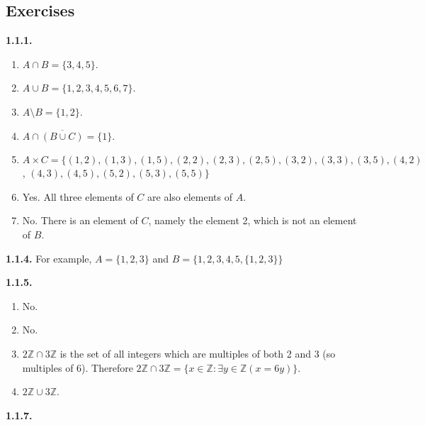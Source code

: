\documentclass[10pt,]{book}
\theoremstyle{plain}
\theoremstyle{definition}
\theoremstyle{definition}
\theoremstyle{definition}
\theoremstyle{definition}
\numberwithin{equation}{chapter}
\newcommand{\Z}{\mathbb Z}
\newcommand{\st}{:}
\renewcommand{\bar}{\overline}
\begin{document}
\subsection*{ Exercises}
\noindent\textbf{1.1.1.} \hypertarget{p-625}{}%
\leavevmode%
\begin{enumerate}[label=(\alph*)]
\item\hypertarget{li-288}{}\(A \cap B = \{3,4,5\}\).%
\item\hypertarget{li-289}{}\(A \cup B = \{1,2,3,4,5,6,7\}\).%
\item\hypertarget{li-290}{}\(A \setminus B = \{1,2\}\).%
\item\hypertarget{li-291}{}\(A \cap \bar{(B \cup C)} = \{1\}\).%
\item\hypertarget{li-292}{}\(A \times C = \{ (1,2), (1,3), (1,5), (2,2), (2,3), (2,5), (3,2), (3,3), (3,5), (4,2)\), \((4,3), (4,5), (5,2), (5,3), (5,5)\}\)%
\item\hypertarget{li-293}{}\hypertarget{p-626}{}%
Yes.  All three elements of \(C\) are also elements of \(A\).%
\item\hypertarget{li-294}{}\hypertarget{p-627}{}%
No. There is an element of \(C\), namely the element 2, which is not an element of \(B\).%
\end{enumerate}
%
\par\smallskip
\noindent\textbf{1.1.4.} \hypertarget{p-636}{}%
For example, \(A = \{1,2,3\}\) and \(B = \{1,2,3,4,5,\{1,2,3\}\}\)%
\par\smallskip
\noindent\textbf{1.1.5.} \hypertarget{p-643}{}%
\leavevmode%
\begin{enumerate}[label=(\alph*)]
\item\hypertarget{li-303}{}\hypertarget{p-644}{}%
No.%
\item\hypertarget{li-304}{}\hypertarget{p-645}{}%
No.%
\item\hypertarget{li-305}{}\(2\Z \cap 3\Z\) is the set of all integers which are multiples of both 2 and 3 (so multiples of 6). Therefore \(2\Z \cap 3\Z = \{x \in \Z \st \exists y\in \Z(x = 6y)\}\).%
\item\hypertarget{li-306}{}\(2\Z \cup 3\Z\).%
\end{enumerate}
%
\par\smallskip
\noindent\textbf{1.1.7.} \hypertarget{p-648}{}%
\leavevmode%
\end{document}
